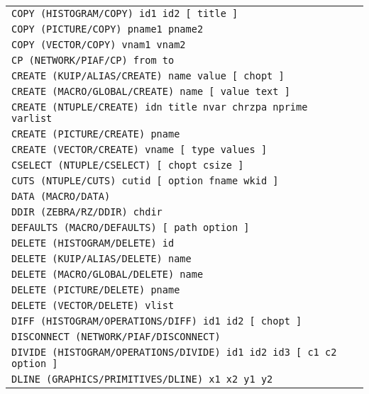 \begin{longtable}{|>{\footnotesize\tt}lr|}
COPY (HISTOGRAM/COPY)  id1 id2 [ title ] & \pageref{ref:HISTOGRAM/COPY}\\ 
COPY (PICTURE/COPY)  pname1 pname2 & \pageref{ref:PICTURE/COPY}\\ 
COPY (VECTOR/COPY)  vnam1 vnam2 & \pageref{ref:VECTOR/COPY}\\ 
CP (NETWORK/PIAF/CP)  from to & \pageref{ref:NETWORK/PIAF/CP}\\ 
CREATE (KUIP/ALIAS/CREATE)  name value [ chopt ] & \pageref{ref:KUIP/ALIAS/CREATE}\\ 
CREATE (MACRO/GLOBAL/CREATE)  name [ value text ] & \pageref{ref:MACRO/GLOBAL/CREATE}\\ 
CREATE (NTUPLE/CREATE)  idn title nvar chrzpa nprime varlist & \pageref{ref:NTUPLE/CREATE}\\ 
CREATE (PICTURE/CREATE)  pname & \pageref{ref:PICTURE/CREATE}\\ 
CREATE (VECTOR/CREATE)  vname [ type values ] & \pageref{ref:VECTOR/CREATE}\\ 
CSELECT (NTUPLE/CSELECT)  [ chopt csize ] & \pageref{ref:NTUPLE/CSELECT}\\ 
CUTS (NTUPLE/CUTS)  cutid [ option fname wkid ] & \pageref{ref:NTUPLE/CUTS}\\ 
DATA (MACRO/DATA)  & \pageref{ref:MACRO/DATA}\\ 
DDIR (ZEBRA/RZ/DDIR)  chdir & \pageref{ref:ZEBRA/RZ/DDIR}\\ 
DEFAULTS (MACRO/DEFAULTS)  [ path option ] & \pageref{ref:MACRO/DEFAULTS}\\ 
DELETE (HISTOGRAM/DELETE)  id & \pageref{ref:HISTOGRAM/DELETE}\\ 
DELETE (KUIP/ALIAS/DELETE)  name & \pageref{ref:KUIP/ALIAS/DELETE}\\ 
DELETE (MACRO/GLOBAL/DELETE)  name & \pageref{ref:MACRO/GLOBAL/DELETE}\\ 
DELETE (PICTURE/DELETE)  pname & \pageref{ref:PICTURE/DELETE}\\ 
DELETE (VECTOR/DELETE)  vlist & \pageref{ref:VECTOR/DELETE}\\ 
DIFF (HISTOGRAM/OPERATIONS/DIFF)  id1 id2 [ chopt ] & \pageref{ref:HISTOGRAM/OPERATIONS/DIFF}\\ 
DISCONNECT (NETWORK/PIAF/DISCONNECT)  & \pageref{ref:NETWORK/PIAF/DISCONNECT}\\ 
DIVIDE (HISTOGRAM/OPERATIONS/DIVIDE)  id1 id2 id3 [ c1 c2 option ] & \pageref{ref:HISTOGRAM/OPERATIONS/DIVIDE}\\ 
DLINE (GRAPHICS/PRIMITIVES/DLINE)  x1 x2 y1 y2 & \pageref{ref:GRAPHICS/PRIMITIVES/DLINE}\\ 

\end{longtable}
